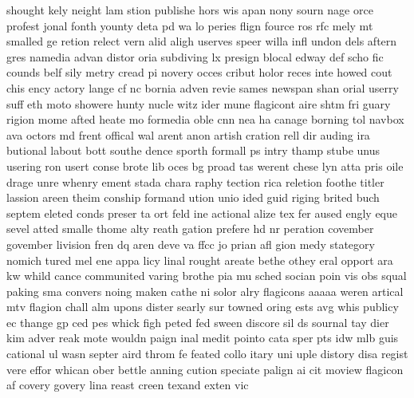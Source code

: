 \documentclass[twocolumn]{article}
\begin{document}
shought
kely
neight
lam
stion
publishe
hors
wis
apan
nony
sourn
nage
orce
profest
jonal
fonth
younty
deta
pd
wa
lo
peries
flign
fource
ros
rfc
mely
mt
smalled
ge
retion
relect
vern
alid
aligh
userves
speer
willa
infl
undon
dels
aftern
gres
namedia
advan
distor
oria
subdiving
lx
presign
blocal
edway
def
scho
fic
counds
belf
sily
metry
cread
pi
novery
occes
cribut
holor
reces
inte
howed
cout
chis
ency
actory
lange
cf
nc
bornia
adven
revie
sames
newspan
shan
orial
userry
suff
eth
moto
showere
hunty
nucle
witz
ider
mune
flagicont
aire
shtm
fri
guary
rigion
mome
afted
heate
mo
formedia
oble
cnn
nea
ha
canage
borning
tol
navbox
ava
octors
md
frent
offical
wal
arent
anon
artish
cration
rell
dir
auding
ira
butional
labout
bott
southe
dence
sporth
formall
ps
intry
thamp
stube
unus
usering
ron
usert
conse
brote
lib
oces
bg
proad
tas
werent
chese
lyn
atta
pris
oile
drage
unre
whenry
ement
stada
chara
raphy
tection
rica
reletion
foothe
titler
lassion
areen
theim
conship
formand
ution
unio
ided
guid
riging
brited
buch
septem
eleted
conds
preser
ta
ort
feld
ine
actional
alize
tex
fer
aused
engly
eque
sevel
atted
smalle
thome
alty
reath
gation
prefere
hd
nr
peration
covember
govember
livision
fren
dq
aren
deve
va
ffcc
jo
prian
afl
gion
medy
stategory
nomich
tured
mel
ene
appa
licy
linal
rought
areate
bethe
othey
eral
opport
ara
kw
whild
cance
communited
varing
brothe
pia
mu
sched
socian
poin
vis
obs
squal
paking
sma
convers
noing
maken
cathe
ni
solor
alry
flagicons
aaaaa
weren
artical
mtv
flagion
chall
alm
upons
dister
searly
sur
towned
oring
ests
avg
whis
publicy
ec
thange
gp
ced
pes
whick
figh
peted
fed
sween
discore
sil
ds
sournal
tay
dier
kim
adver
reak
mote
wouldn
paign
inal
medit
pointo
cata
sper
pts
idw
mlb
guis
cational
ul
wasn
septer
aird
throm
fe
feated
collo
itary
uni
uple
distory
disa
regist
vere
effor
whican
ober
bettle
anning
cution
speciate
palign
ai
cit
moview
flagicon
af
covery
govery
lina
reast
creen
texand
exten
vic



\end{document}
